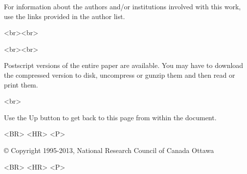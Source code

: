 \documentclass[12pt,twoside]{article}      %
\begin{document}
\begin{htmlonly}
For information about the authors and/or institutions involved with this
work, use the links provided in the author list.\\
\begin{rawhtml}
<br><br>
\end{rawhtml}

\begin{rawhtml}
<br><br>
\end{rawhtml}

Postscript versions of the entire paper are available.  You may have to
download the compressed version to disk, uncompress or gunzip them and
then read or print them.
\begin{rawhtml}
<br>
\end{rawhtml}

Use the Up button to get back to this page from within the document.
\begin{rawhtml}
<BR> <HR> <P>
\end{rawhtml}
\copyright
Copyright 1995-2013, National Research Council of Canada
Ottawa
\begin{rawhtml}
<BR> <HR> <P>
\end{rawhtml}
\end{htmlonly}

\pagestyle{empty}

\vspace*{-2cm}
\end{document}

